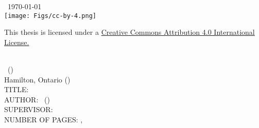 \documentclass[
11pt, %
oneside, %
english, %
doublespacing
]{McMasterThesis} %
\begin{document}
\begin{center}
\vfill

\begin{center}
{\large \univname\, \today}\\[4cm] 
\leavevmode
\texttt{[image: Figs/cc-by-4.png]}
\end{center}
\label{fig:cc}
\scriptsize{This thesis is licensed under a \href{http://creativecommons.org/licenses/by/4.0/}{Creative Commons Attribution 4.0 International License.}}



\end{center}




\newpage
{} %
\setcounter{page}{2} %

\noindent %
\univname \\ 
\degreename\, (\the\year) \\
Hamilton, Ontario (\deptname) \\[1.5cm]
TITLE: \ttitle \\
AUTHOR: \authorname\,  %
(\univname)  \\
SUPERVISOR: \supname\, \\ 
NUMBER OF PAGES: \pageref{lastoffront}, \pageref{LastPage}  %

\clearpage

\end{document}
